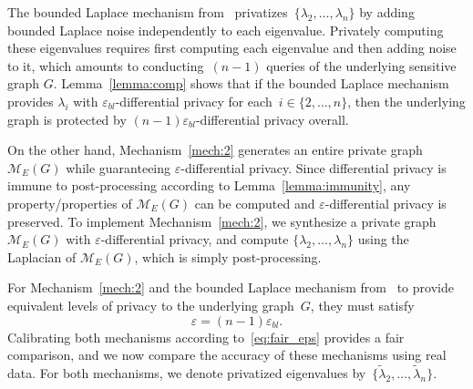 \documentclass[conference]{ieeeconf}
\begin{document}
The bounded Laplace mechanism from~\cite{hawkins2023node} privatizes~$\{\lambda_2,\dots,\lambda_n\}$ by adding bounded Laplace noise independently to each eigenvalue.
Privately computing these eigenvalues requires
first computing each eigenvalue and then adding noise to it, which amounts to conducting~$(n-1)$ queries of the underlying sensitive graph $G$.
Lemma~\ref{lemma:comp} shows that if the bounded Laplace mechanism provides $\lambda_i$ with $\varepsilon_{bl}$-differential privacy
for each~$i \in \{2, \ldots, n\}$, 
then the underlying graph is protected by $(n-1)\varepsilon_{bl}$-differential privacy overall. 

On the other hand, Mechanism~\ref{mech:2} generates an entire private graph~$\mathcal{M}_E(G)$ while guaranteeing $\varepsilon$-differential privacy. Since differential privacy is immune to post-processing according to Lemma~\ref{lemma:immunity}, any property/properties of $\mathcal{M}_E(G)$ can be computed
and $\varepsilon$-differential privacy is preserved.
To implement Mechanism~\ref{mech:2}, we synthesize a private graph $\mathcal{M}_E(G)$ with $\varepsilon$-differential privacy, and compute $\{\lambda_2,\dots,\lambda_n\}$ using the Laplacian of $\mathcal{M}_E(G)$, which is simply post-processing. 

For Mechanism~\ref{mech:2} and the bounded Laplace mechanism from~\cite{hawkins2023node} to provide equivalent levels of privacy to 
the underlying graph~$G$, they must satisfy
\begin{equation}
    \varepsilon=(n-1)\varepsilon_{bl}.\label{eq:fair_eps}
\end{equation}
Calibrating both mechanisms according to~\eqref{eq:fair_eps} provides a fair comparison, 
and we now compare the accuracy of these mechanisms using real data.
For both mechanisms, 
we denote privatized eigenvalues by~$\{\tilde\lambda_2,\dots,\tilde\lambda_n\}.$
\end{document}
